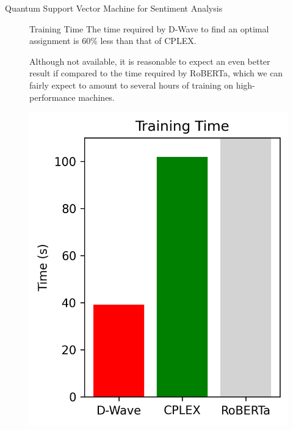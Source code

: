 \documentclass[final]{beamer}
\newlength{\colwidth}
\begin{document}
\begin{frame}[t,fragile]
\begin{columns}[t]
\begin{column}{\colwidth}
\begin{block}{Quantum Support Vector Machine for Sentiment Analysis}
    \begin{figure}[h!]
      \centering
      \begin{minipage}{0.65\textwidth}
        \begin{alertblock}{Training Time}
          The time required by D-Wave to find an optimal assignment is 60\% less than that of CPLEX. 

          Although not available, it is reasonable to expect an even better result if compared to the time required by RoBERTa, which we can fairly expect to amount to several hours of training on high-performance machines.
        \end{alertblock}
      \end{minipage}%
      \hfill
      \begin{minipage}{0.3\textwidth}
          \centering
          \includegraphics[height=0.15\textheight]{logos/training.png}
      \end{minipage}
    \end{figure}


\end{block}
\end{column}
\end{columns}
\end{frame}
\end{document}
